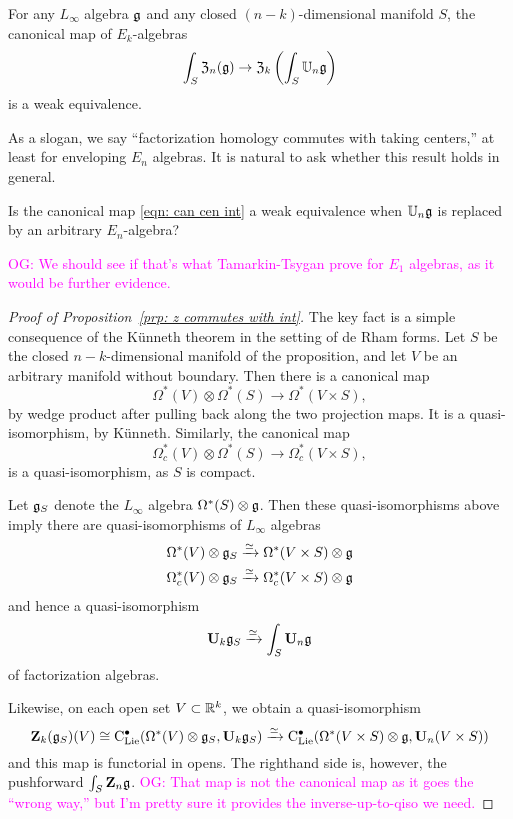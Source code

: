 \documentclass[11pt]{amsart}
\numberwithin{equation}{section}
\def\owen{\textcolor{magenta}{OG: }\textcolor{magenta}}
\begin{document}
\begin{prp}
\label{prp: z commutes with int}
For any $L_\infty$ algebra $\mathfrak g$ and any closed $(n-k)$-dimensional manifold $S$,
the canonical map of $E_k$-algebras
\[
\int_{S} \mathfrak Z_n(\mathfrak g) \to \mathfrak Z_k \left( \int_S \mathbb U_n \mathfrak g \right)
\]
is a weak equivalence.
\end{prp}

As a slogan, we say ``factorization homology commutes with taking centers,'' 
at least for enveloping $E_n$ algebras.
It is natural to ask whether this result holds in general.

\begin{qtn}
Is the canonical map \eqref{eqn: can cen int} a weak equivalence when $\mathbb U_n \mathfrak g$ is replaced by an arbitrary $E_n$-algebra?
\end{qtn}

\owen{We should see if that's what Tamarkin-Tsygan prove for  $E_1$ algebras, as it would be further evidence.}

\begin{proof}[Proof of Proposition~\ref{prp: z commutes with int}]
The key fact is a simple consequence of the K\"unneth theorem in the setting of de Rham forms.
Let $S$ be the closed $n-k$-dimensional manifold of the proposition,
and let $V$ be an arbitrary manifold without boundary.
Then there is a canonical map
\[
\Omega^*(V) \otimes \Omega^*(S) \to \Omega^*(V \times S),
\]
by wedge product after pulling back along the two projection maps.
It is a quasi-isomorphism, by K\"unneth.
Similarly, the canonical map
\[
\Omega_c^*(V) \otimes \Omega^*(S) \to \Omega_c^*(V \times S),
\]
is a quasi-isomorphism, as $S$ is compact.

Let $\mathfrak g_S$ denote the $L_\infty$ algebra $\Omega^*(S) \otimes \mathfrak g$. 
Then these quasi-isomorphisms above imply there are quasi-isomorphisms of $L_\infty$ algebras
\begin{align*}
\Omega^*(V) \otimes \mathfrak g_S &\xrightarrow{\simeq} \Omega^*(V \times S) \otimes \mathfrak g \\
\Omega_c^*(V) \otimes \mathfrak g_S &\xrightarrow{\simeq} \Omega_c^*(V \times S) \otimes \mathfrak g 
\end{align*}
and hence a quasi-isomorphism
\[
\mathbf U_k \mathfrak g_S \xrightarrow{\simeq} \int_S \mathbf U_n \mathfrak g
\]
of factorization algebras.

Likewise, on each open set $V \subset \mathbb R^k$, 
we obtain a quasi-isomorphism
\[
\mathbf Z_k(\mathfrak g_S)(V) \cong {\rm C}_{\rm Lie}^\bullet( \Omega^*(V) \otimes \mathfrak g_S, \mathbf U_k \mathfrak g_S) \xrightarrow{\simeq} {\rm C}_{\rm Lie}^\bullet(\Omega^*(V \times S) \otimes \mathfrak g, \mathbf U_n(V \times S))
\]
and this map is functorial in opens.
The righthand side is, however, the pushforward $\int_S \mathbf Z_n \mathfrak g$.
\owen{That map is not the canonical map as it goes the ``wrong way,'' but I'm pretty sure it provides the inverse-up-to-qiso we need.}
\end{proof}
\end{document}
